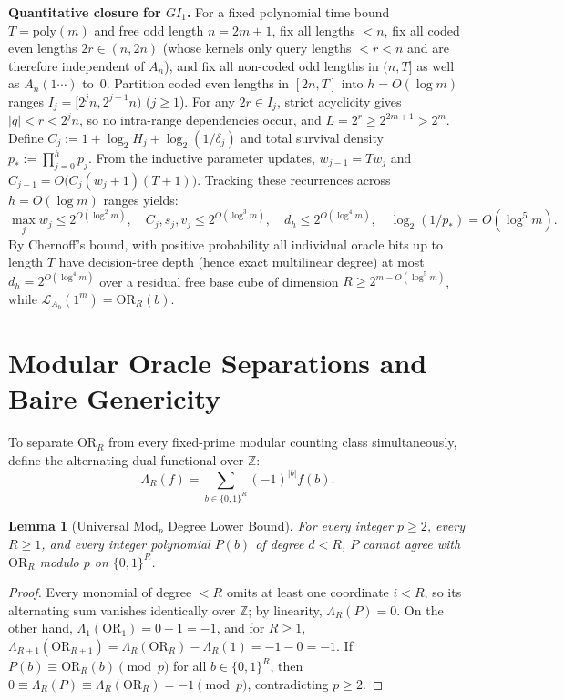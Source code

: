 \documentclass[11pt,a4paper]{article}
\newtheorem{lemma}[theorem]{Lemma}
\theoremstyle{definition}
\theoremstyle{remark}
\newcommand{\OR}{\mathrm{OR}}
\newcommand{\Z}{\mathbb{Z}}
\newcommand{\GI}{GI_1}
\begin{document}
\textbf{Quantitative closure for $\GI$.} For a fixed polynomial time bound $T = \mathrm{poly}(m)$ and free odd length $n = 2m+1$, fix all lengths $< n$, fix all coded even lengths $2r \in (n, 2n)$ (whose kernels only query lengths $< r < n$ and are therefore independent of $A_n$), and fix all non-coded odd lengths in $(n, T]$ as well as $A_n(1\cdots)$ to~$0$. Partition coded even lengths in $[2n, T]$ into $h = O(\log m)$ ranges $I_j = [2^j n, 2^{j+1} n)$ ($j \ge 1$). For any $2r \in I_j$, strict acyclicity gives $|q| < r < 2^j n$, so no intra-range dependencies occur, and $L = 2^r \ge 2^{2m+1} > 2^m$. Define $C_j := 1 + \log_2 H_j + \log_2(1/\delta_j)$ and total survival density $p_* := \prod_{j=0}^h p_j$. From the inductive parameter updates, $w_{j-1} = T w_j$ and $C_{j-1} = O\bigl(C_j (w_j + 1)(T + 1)\bigr)$. Tracking these recurrences across $h = O(\log m)$ ranges yields:
\[
  \max_j w_j \le 2^{O(\log^2 m)},\quad
  C_j, s_j, v_j \le 2^{O(\log^3 m)},\quad
  d_h \le 2^{O(\log^4 m)},\quad
  \log_2(1/p_*) = O(\log^5 m).
\]
By Chernoff's bound, with positive probability all individual oracle bits up to length $T$ have decision-tree depth (hence exact multilinear degree) at most $d_h = 2^{O(\log^4 m)}$ over a residual free base cube of dimension $R \ge 2^{m - O(\log^5 m)}$, while $\mathcal{L}_{A_b}(1^m) = \OR_R(b)$.

\section{Modular Oracle Separations and Baire Genericity}

To separate $\OR_R$ from every fixed-prime modular counting class simultaneously, define the alternating dual functional over $\Z$:
\[
  \Lambda_R(f) = \sum_{b \in \{0,1\}^R} (-1)^{|b|} f(b).
\]

\begin{lemma}[Universal $\mathrm{Mod}_p$ Degree Lower Bound]
\label{lem:modp-lb}
For every integer $p \ge 2$, every $R \ge 1$, and every integer polynomial $P(b)$ of degree $d < R$, $P$ cannot agree with $\OR_R$ modulo $p$ on $\{0,1\}^R$.
\end{lemma}

\begin{proof}
Every monomial of degree $< R$ omits at least one coordinate $i < R$, so its alternating sum vanishes identically over $\Z$; by linearity, $\Lambda_R(P) = 0$. On the other hand, $\Lambda_1(\OR_1) = 0 - 1 = -1$, and for $R \ge 1$, $\Lambda_{R+1}(\OR_{R+1}) = \Lambda_R(\OR_R) - \Lambda_R(1) = -1 - 0 = -1$. If $P(b) \equiv \OR_R(b) \pmod p$ for all $b \in \{0,1\}^R$, then $0 \equiv \Lambda_R(P) \equiv \Lambda_R(\OR_R) = -1 \pmod p$, contradicting $p \ge 2$.
\end{proof}
\end{document}
